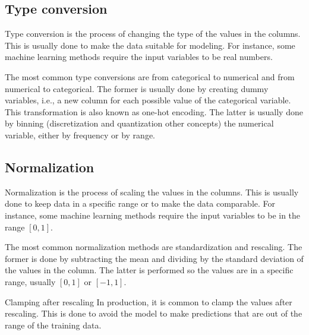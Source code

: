 \subsection{Type conversion}

Type conversion is the process of changing the type of the values in the columns.  This
is usually done to make the data suitable for modeling.  For instance, some machine
learning methods require the input variables to be real numbers.

The most common type conversions are from categorical to numerical and from numerical to
categorical.  The former is usually done by creating dummy variables, i.e., a new column
for each possible value of the categorical variable.  This transformation is also known as
one-hot encoding.  The latter is usually done by binning (discretization and quantization
other concepts) the numerical variable, either by
frequency or by range.


\subsection{Normalization}

Normalization is the process of scaling the values in the columns.  This is usually done to
keep data in a specific range or to make the data comparable.  For instance, some machine
learning methods require the input variables to be in the range $[0, 1]$.

The most common normalization methods are standardization and rescaling.  The former is done
by subtracting the mean and dividing by the standard deviation of the values in the column.
The latter is performed so the values are in a specific range, usually $[0, 1]$ or $[-1, 1]$.

\begin{hlbox}{Clamping after rescaling}
  In production, it is common to clamp the values after rescaling.  This is done to avoid
  the model to make predictions that are out of the range of the training data.
\end{hlbox}

